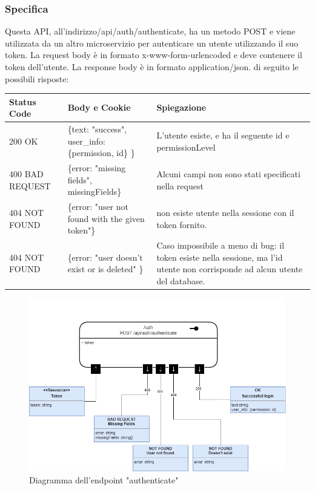 \documentclass{report}
\begin{document}
\subsubsection*{Specifica}
Questa API, all'indirizzo/api/auth/authenticate, ha un metodo POST e viene utilizzata da un altro microservizio per autenticare un utente utilizzando il suo token.
La request body è in formato x-www-form-urlencoded e deve contenere il token dell'utente.
La response body è in formato application/json. di seguito le possibili risposte:
\begin{center} %
	\centering
	\begin{tabular}{ |p{4cm}|p{5cm}|p{4cm}| }
		\hline
		\centering Status Code & \qquad\quad Body e Cookie & \qquad\qquad Spiegazione\\ %
		\hline
		200 OK & \{text: "success", user\_info: \{permission, id\} \} & L'utente esiste, e ha il seguente id e permissionLevel 	\\
		\hline
		400 BAD REQUEST & \{error: "missing fields", missingFields\} & Alcuni campi non sono stati specificati nella request\\ %
		\hline
		404 NOT FOUND & \{error: "user not found with the given token"\} & non esiste utente nella sessione con il token fornito.\\%
		\hline
		404 NOT FOUND & \{error: "user doesn't exist or is deleted" \} & Caso impossibile a meno di bug: il token esiste nella sessione, ma l'id utente non corrisponde ad alcun utente del database. \\
		\hline
		
	\end{tabular}
\end{center}
\begin{figure}[H]
	\centering\includegraphics[width=1\textwidth]{images/microservizio-autenticazione/diagrams/diagramma_auth.drawio.png}
	\caption{Diagramma dell'endpoint "authenticate"}
\end{figure}
\end{document}

